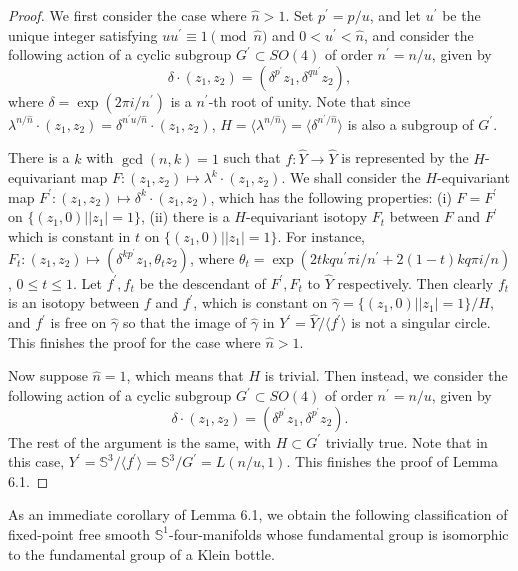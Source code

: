 \documentclass[11pt]{amsart}
\theoremstyle{plain}
\numberwithin{theorem}{section}
\theoremstyle{definition}
\begin{document}
\begin{proof}
We first consider the case where $\hat{n}>1$. Set $p^\prime=p/u$, and let $u^\prime$ be the unique
integer satisfying $uu^\prime\equiv 1 \pmod{\hat{n}}$ and $0<u^\prime<\hat{n}$, and consider the following
action of a cyclic subgroup $G^\prime\subset SO(4)$ of order $n^\prime=n/u$, given by
$$
\delta\cdot (z_1,z_2)=(\delta^{p^\prime} z_1,\delta^{qu^\prime}z_2),
$$
where $\delta=\exp (2\pi i/n^\prime)$ is a $n^\prime$-th root of unity. Note that since 
$\lambda^{n/\hat{n}}\cdot (z_1,z_2)=\delta^{n^\prime u/\hat{n}}\cdot (z_1,z_2)$, 
$H=\langle \lambda^{n/\hat{n}}\rangle=\langle \delta^{n^\prime/\hat{n}}\rangle$ 
is also a subgroup of $G^\prime$. 

There is a $k$ with $\gcd(n,k)=1$ such that $f: \hat{Y}\rightarrow \hat{Y}$ is represented 
by the $H$-equivariant map $F: (z_1,z_2)\mapsto \lambda^k\cdot (z_1,z_2)$. We shall consider the 
$H$-equivariant map $F^\prime: (z_1,z_2)\mapsto \delta^k\cdot (z_1,z_2)$, which has the 
following properties: (i) $F=F^\prime$ on $\{(z_1,0)||z_1|=1\}$, (ii) there is a $H$-equivariant 
isotopy $F_{t}$ between $F$ and $F^\prime$ which is constant in $t$ on $\{(z_1,0)||z_1|=1\}$. 
For instance, $F_t: (z_1,z_2)\mapsto (\delta^{kp^\prime}z_1, \theta_t z_2)$, where 
$\theta_t=\exp (2tkqu^\prime\pi i /n^\prime+2(1-t)kq\pi i/n)$, $0\leq t\leq 1$. Let $f^\prime, f_t$ be the
descendant of $F^\prime, F_t$ to $\hat{Y}$ respectively. Then clearly $f_t$ is an isotopy between
$f$ and $f^\prime$, which is constant on $\hat{\gamma}=\{(z_1,0)||z_1|=1\}/H$, and $f^\prime$ is 
free on $\hat{\gamma}$ so that the image of $\hat{\gamma}$ in 
$Y^\prime=\hat{Y}/\langle f^\prime \rangle$ is not a singular circle. This finishes the proof for the case
where $\hat{n}>1$.

Now suppose $\hat{n}=1$, which means that $H$ is trivial. Then instead, we consider the following 
action of a cyclic subgroup $G^\prime\subset SO(4)$ of order $n^\prime=n/u$, given by
$$
\delta\cdot (z_1,z_2)=(\delta^{p^\prime} z_1,\delta^{p^\prime}z_2).
$$
The rest of the argument is the same, with $H\subset G^\prime$ trivially true. 
Note that in this case, $Y^\prime={{\mathbb S}}^3/\langle f^\prime\rangle={{\mathbb S}}^3/G^\prime=L(n/u,1)$. This finishes
the proof of Lemma 6.1.

\end{proof} 

As an immediate corollary of Lemma 6.1, we obtain the following classification of 
fixed-point free smooth ${{\mathbb S}}^1$-four-manifolds whose fundamental group is isomorphic to the fundamental group of a Klein bottle. 
\end{document}
